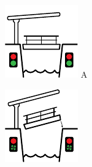 
\begin{figure}[H]
	\centering
	\begin{minipage}[b]{0.23\textwidth}
		\includegraphics[width=\textwidth]{Hoofdstukken/Bruggen/pdf/brug_aanstonds_toegestaan.pdf}
		\centering
		A
	\end{minipage}
	\hfill
	\begin{minipage}[b]{0.23\textwidth}
		\includegraphics[width=\textwidth]{Hoofdstukken/Bruggen/pdf/brug_sluitend.pdf}

\end{minipage}
\end{figure}
